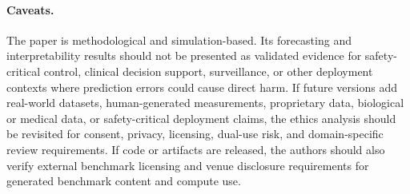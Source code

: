 \paragraph{Caveats.}
The paper is methodological and simulation-based. Its forecasting and
interpretability results should not be presented as validated evidence for
safety-critical control, clinical decision support, surveillance, or other
deployment contexts where prediction errors could cause direct harm. If future
versions add real-world datasets, human-generated measurements, proprietary
data, biological or medical data, or safety-critical deployment claims, the
ethics analysis should be revisited for consent, privacy, licensing,
dual-use risk, and domain-specific review requirements. If code or artifacts
are released, the authors should also verify external benchmark licensing and
venue disclosure requirements for generated benchmark content and compute use.
